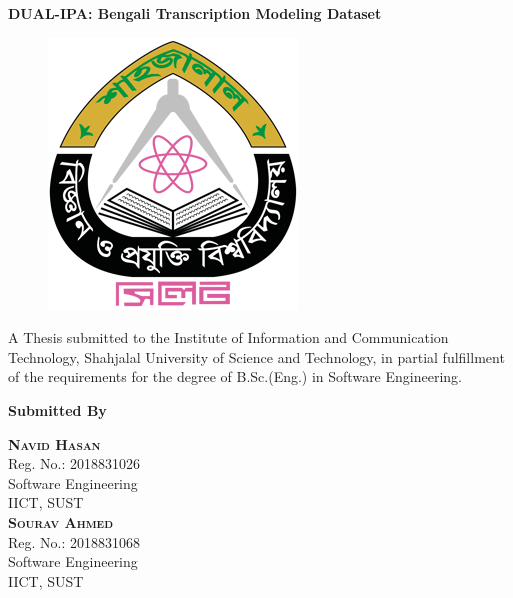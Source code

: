 \begin{titlepage}
    \begin{center}
        \LARGE
          \textbf{DUAL-IPA: Bengali Transcription Modeling Dataset }\\

        \vspace{0.5cm}
        
        \begin{figure}[h!]
            \centering
            \includegraphics[scale=1.5]{Images/Logo/Shahjalal_University_of_Science_and_Technology_logo.png}
            \label{fig:my_label}
        \end{figure}
        \vspace{0.3cm}
        
        \large{A Thesis submitted to the Institute of Information and Communication Technology, Shahjalal University of Science and Technology, in partial fulfillment of the requirements for the degree of B.Sc.(Eng.) in Software Engineering.}

        \vspace{1cm}
        {\Large \bf Submitted By}
        \begin{multicols}{2}
           \textsc{\Large \bf Navid Hasan }\\
                Reg. No.: 2018831026\\ 
                Software Engineering\\
                IICT, SUST\\
           
        	\textsc{\Large \bf Sourav Ahmed }\\
                Reg. No.: 2018831068\\ 
                Software Engineering\\
                IICT, SUST\\
				\end{multicols}
				

\end{center}
\end{titlepage}
